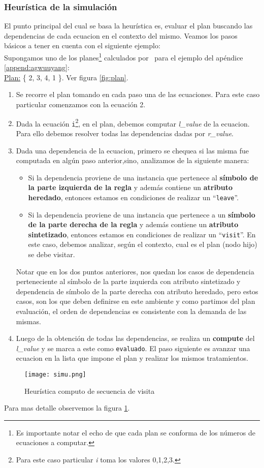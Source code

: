 \subsubsection*{Heurística de la simulación}
El punto principal del cual se basa la heurística es, evaluar el plan buscando las dependencias de cada ecuacion en el contexto del mismo. Veamos los pasos básicos a tener en cuenta con el siguiente ejemplo:\\
Supongamos uno de los planes\footnote{Es importante notar el echo de que cada plan se conforma de los números de ecuaciones a computar.} calculados por \maggen\ para el ejemplo del apéndice \ref{append:agwuuyang}:\\
\underline{Plan:} \{ 2, 3, 4, 1 \}. Ver figura \ref{fig:plan}.
\begin{enumerate}
\item Se recorre el plan tomando en cada paso una de las ecuaciones. Para este caso particular comenzamos con la ecuación 2.
\item Dada la ecuación \texttt{i}\footnote{Para este caso particular \textit{i} toma los valores 0,1,2,3.}, en el plan, debemos computar \textit{l\_value} de la ecuacion. Para ello debemos resolver todas las dependencias dadas por \textit{r\_value}.
\item Dada una dependencia de la ecuacion, primero se chequea si las misma fue computada en algún paso anterior,sino, analizamos de la siguiente manera:
\begin{itemize}
\item Si la dependencia proviene de una instancia que pertenece al \textbf{símbolo de la parte izquierda de la regla} y además contiene un \textbf{atributo heredado}, entonces estamos en condiciones de realizar un ``\texttt{leave}''.
\item Si la dependencia proviene de una instancia que pertenece a un \textbf{símbolo de la parte derecha de la regla} y además contiene un \textbf{atributo sintetizado}, entonces estamos en condiciones de realizar un ``\texttt{visit}''. En este caso, debemos analizar, según el contexto, cual es el plan (nodo hijo) se debe visitar. 
\end{itemize}
Notar que en los dos puntos anteriores, nos quedan los casos de dependencia perteneciente al símbolo de la parte izquierda con atributo sintetizado y dependencia de símbolo de la parte derecha con atributo heredado, pero estos casos, son los que deben definirse en este ambiente y como partimos del plan evaluación, el orden de dependencias es consistente con la demanda de las mismas.
\item Luego de la obtención de todas las dependencias, se realiza un \textbf{compute} del \textit{l\_value} y se marca a este como \texttt{evaluado}. El paso siguiente es avanzar una ecuacion en la lista que impone el plan y realizar los mismos tratamientos.
\end{enumerate} 
\begin{figure}\centering
\texttt{[image: simu.png]}
\caption{\label{fig:simul}Heurística computo de secuencia de visita}
\end{figure}
Para mas detalle observemos la figura \ref{fig:simul}.

